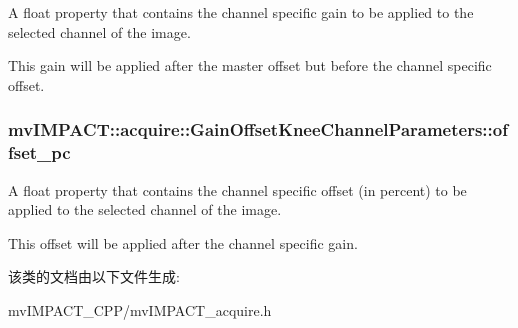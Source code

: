 A float property that contains the channel specific gain to be applied to the selected channel of the image. 

This gain will be applied after the master offset but before the channel specific offset. \hypertarget{classmv_i_m_p_a_c_t_1_1acquire_1_1_gain_offset_knee_channel_parameters_a6f4020ed712536bb048f7126944e47d1}{
\subsubsection[{offset\+\_\+pc}]{ mv\+I\+M\+P\+A\+C\+T\+::acquire\+::\+Gain\+Offset\+Knee\+Channel\+Parameters\+::offset\+\_\+pc}}\label{classmv_i_m_p_a_c_t_1_1acquire_1_1_gain_offset_knee_channel_parameters_a6f4020ed712536bb048f7126944e47d1}


A float property that contains the channel specific offset (in percent) to be applied to the selected channel of the image. 

This offset will be applied after the channel specific gain. 

该类的文档由以下文件生成\+:\begin{DoxyCompactItemize}
\item 
mv\+I\+M\+P\+A\+C\+T\+\_\+\+C\+P\+P/mv\+I\+M\+P\+A\+C\+T\+\_\+acquire.\+h\end{DoxyCompactItemize}

